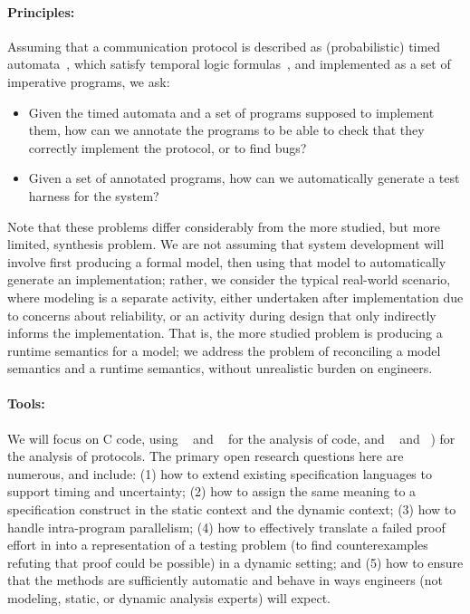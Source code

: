 \paragraph{Principles:} Assuming that a communication protocol is described
as (probabilistic) timed automata~\cite{AD1994:TCS},
which satisfy temporal logic
formulas~\cite{BLM2017:LNCS}, and implemented as a set of
imperative programs, we ask:
\begin{itemize}[labelsep=3pt,leftmargin=12pt]
\item Given the timed automata and a set of programs supposed to
  implement them, how can we annotate the programs to be able to check
  that they correctly implement the protocol, or to find bugs?
\item Given a set of annotated programs, how can we automatically
  generate a test harness for the system?
\end{itemize}

Note that these problems differ considerably from the more studied,
but more limited, synthesis problem.  We are not assuming that
system development will involve first producing a formal model, then
using that model to automatically generate an implementation; rather,
we consider the typical real-world scenario, where modeling is a
separate activity, either undertaken after implementation due to
concerns about reliability, or an activity during design that only
indirectly informs the implementation.  That is, the more studied
problem is producing a runtime semantics for a model; we address the
problem of reconciling a model semantics and a runtime semantics,
without unrealistic burden on engineers.


\paragraph{Tools:} We will focus on C code, using \framac~\cite{KKP2015:FAC} and \deepstate~\cite{DeepState}
for the analysis of code, and
\uppaal~\cite{uppaal} and
\prism~\cite{KNP2011:CAV}) for the analysis of protocols.  The primary open research questions here are numerous, and include:
(1) how to extend existing specification languages to support timing and uncertainty;
(2) how to assign the same meaning to a specification construct in
  the static \framac context and the dynamic \deepstate context;
(3) how to handle intra-program parallelism;
(4) how to effectively translate a failed proof effort in \framac
  into a representation of a testing problem (to find counterexamples
  refuting that proof could be possible) in a dynamic setting; and
(5) how to ensure that the methods are sufficiently automatic
  and behave in ways engineers (not modeling, static, or dynamic
  analysis experts) will expect.

